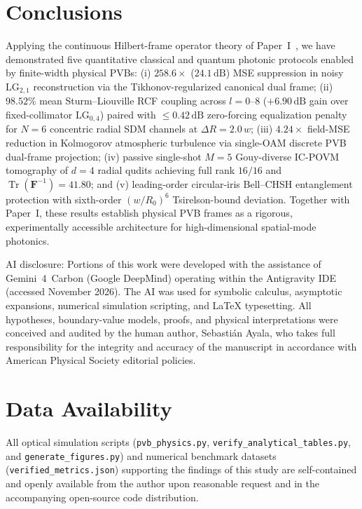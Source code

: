 \documentclass[aps,pra,onecolumn,notitlepage,11pt,tightenlines,nofootinbib,floatfix,longbibliography]{revtex4-2}
\begin{document}
\section{Conclusions}
\label{sec:conclusions}

Applying the continuous Hilbert-frame operator theory of Paper~I~\cite{AyalaPaperI}, we have demonstrated five quantitative classical and quantum photonic protocols enabled by finite-width physical PVBs: (i) $258.6\times$ ($24.1\,\mathrm{dB}$) MSE suppression in noisy $\mathrm{LG}_{2,1}$ reconstruction via the Tikhonov-regularized canonical dual frame; (ii) $98.52\%$ mean Sturm--Liouville RCF coupling across $l = 0\text{--}8$ ($+6.90\,\mathrm{dB}$ gain over fixed-collimator $\mathrm{LG}_{0,4}$) paired with $\le 0.42\,\mathrm{dB}$ zero-forcing equalization penalty for $N = 6$ concentric radial SDM channels at $\Delta R = 2.0\,w$; (iii) $4.24\times$ field-MSE reduction in Kolmogorov atmospheric turbulence via single-OAM discrete PVB dual-frame projection; (iv) passive single-shot $M = 5$ Gouy-diverse IC-POVM tomography of $d = 4$ radial qudits achieving full rank $16/16$ and $\operatorname{Tr}(\mathbf{F}^{-1}) = 41.80$; and (v) leading-order circular-iris Bell--CHSH entanglement protection with sixth-order $(w/R_0)^6$ Tsirelson-bound deviation. Together with Paper~I, these results establish physical PVB frames as a rigorous, experimentally accessible architecture for high-dimensional spatial-mode photonics.

\begin{acknowledgments}
AI disclosure: Portions of this work were developed with the assistance of Gemini~4~Carbon (Google DeepMind) operating within the Antigravity IDE (accessed November 2026). The AI was used for symbolic calculus, asymptotic expansions, numerical simulation scripting, and \LaTeX{} typesetting. All hypotheses, boundary-value models, proofs, and physical interpretations were conceived and audited by the human author, Sebasti\'an Ayala, who takes full responsibility for the integrity and accuracy of the manuscript in accordance with American Physical Society editorial policies.
\end{acknowledgments}

\section*{Data Availability}
{\sloppy All optical simulation scripts (\texttt{pvb\_physics.py}, \texttt{verify\_analytical\_tables.py}, and \texttt{generate\_figures.py}) and numerical benchmark datasets (\texttt{verified\_metrics.json}) supporting the findings of this study are self-contained and openly available from the author upon reasonable request and in the accompanying open-source code distribution.\par}
\end{document}
